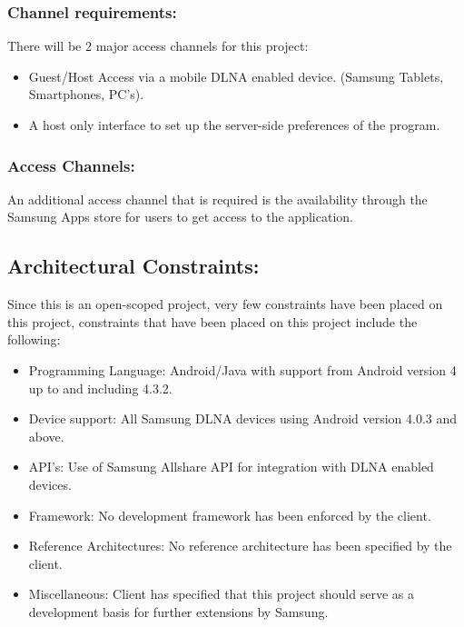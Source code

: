 \documentclass[12pt]{article}
\begin{document}
\subsubsection{Channel requirements: } 
There will be 2 major access channels for this project:
\begin{itemize}
\item Guest/Host Access via a mobile DLNA enabled device. (Samsung Tablets, Smartphones, PC's).
\item A host only interface to set up the server-side preferences of the program.
\end{itemize}

\subsubsection{Access Channels:}
An additional access channel that is required is the availability through the Samsung Apps store for users to get access to the application.

\newpage
\subsection{Architectural Constraints:}
Since this is an open-scoped project, very few constraints have been placed on this project,
constraints that have been placed on this project include the following:
\begin{itemize}
\item Programming Language: Android/Java with support from Android version 4 up to and including 4.3.2.
\item Device support: All Samsung DLNA devices using Android version 4.0.3 and above.
\item API's: Use of Samsung Allshare API for integration with DLNA enabled devices.
\item Framework: No development framework has been enforced by the client.
\item Reference Architectures: No reference architecture has been specified by the client.
\item Miscellaneous: Client has specified that this project should serve as a development basis for further extensions by Samsung.
\end{itemize}

\newpage
\end{document}
